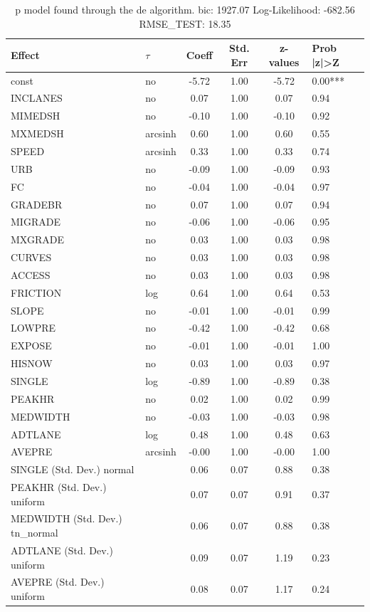 \begin{table}
	\caption{p model found through the de algorithm. bic: 1927.07 Log-Likelihood: -682.56 RMSE_TEST: 18.35}
	\begin{center}
		\begin{tabular}{|l|l|c|c|c|l|}
			\hline
			Effect & $\tau$ & Coeff & Std. Err & z-values & Prob |z|>Z \\
			\hline
			const & no & -5.72 & 1.00 & -5.72 & 0.00*** \\
			\hline
			INCLANES & no & 0.07 & 1.00 & 0.07 & 0.94 \\
			\hline
			MIMEDSH & no & -0.10 & 1.00 & -0.10 & 0.92 \\
			\hline
			MXMEDSH & arcsinh & 0.60 & 1.00 & 0.60 & 0.55 \\
			\hline
			SPEED & arcsinh & 0.33 & 1.00 & 0.33 & 0.74 \\
			\hline
			URB & no & -0.09 & 1.00 & -0.09 & 0.93 \\
			\hline
			FC & no & -0.04 & 1.00 & -0.04 & 0.97 \\
			\hline
			GRADEBR & no & 0.07 & 1.00 & 0.07 & 0.94 \\
			\hline
			MIGRADE & no & -0.06 & 1.00 & -0.06 & 0.95 \\
			\hline
			MXGRADE & no & 0.03 & 1.00 & 0.03 & 0.98 \\
			\hline
			CURVES & no & 0.03 & 1.00 & 0.03 & 0.98 \\
			\hline
			ACCESS & no & 0.03 & 1.00 & 0.03 & 0.98 \\
			\hline
			FRICTION & log & 0.64 & 1.00 & 0.64 & 0.53 \\
			\hline
			SLOPE & no & -0.01 & 1.00 & -0.01 & 0.99 \\
			\hline
			LOWPRE & no & -0.42 & 1.00 & -0.42 & 0.68 \\
			\hline
			EXPOSE & no & -0.01 & 1.00 & -0.01 & 1.00 \\
			\hline
			HISNOW & no & 0.03 & 1.00 & 0.03 & 0.97 \\
			\hline
			SINGLE & log & -0.89 & 1.00 & -0.89 & 0.38 \\
			\hline
			PEAKHR & no & 0.02 & 1.00 & 0.02 & 0.99 \\
			\hline
			MEDWIDTH & no & -0.03 & 1.00 & -0.03 & 0.98 \\
			\hline
			ADTLANE & log & 0.48 & 1.00 & 0.48 & 0.63 \\
			\hline
			AVEPRE & arcsinh & -0.00 & 1.00 & -0.00 & 1.00 \\
			\hline
			SINGLE (Std. Dev.) normal &  & 0.06 & 0.07 & 0.88 & 0.38 \\
			\hline
			PEAKHR (Std. Dev.) uniform &  & 0.07 & 0.07 & 0.91 & 0.37 \\
			\hline
			MEDWIDTH (Std. Dev.) tn_normal &  & 0.06 & 0.07 & 0.88 & 0.38 \\
			\hline
			ADTLANE (Std. Dev.) uniform &  & 0.09 & 0.07 & 1.19 & 0.23 \\
			\hline
			AVEPRE (Std. Dev.) uniform &  & 0.08 & 0.07 & 1.17 & 0.24 \\
			\hline
		\end{tabular}
	\end{center}
\end{table}